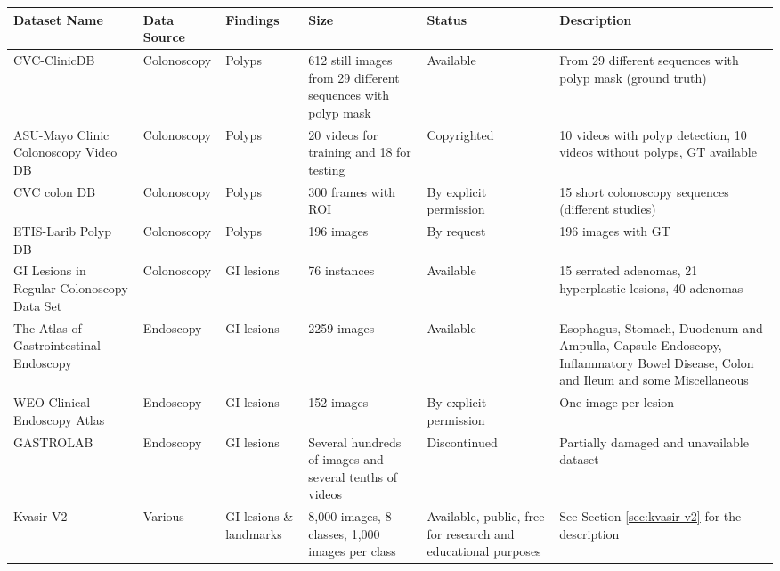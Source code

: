 \documentclass[thesis.tex]{subfiles}
\begin{document}
\begin{table}[h!] %
  \scriptsize
  \centering
  \begin{tabular}{|p{}|p{}|p{}|p{}|p{}|p{}|}
  	\hline
  	\textbf{Dataset Name}	&\textbf{Data Source}	&\textbf{Findings}	&\textbf{Size}	&\textbf{Status}		&\textbf{Description} \\
    \hline
    CVC-ClinicDB \cite{ExploringClinical16}	&Colonoscopy	&Polyps		&612 still images from 29 different sequences with polyp mask	&Available	&From 29 different sequences with
polyp mask (ground truth) \\ 
    \hline
    ASU-Mayo Clinic Colonoscopy Video DB \cite{AutomatedPolyp16}	&Colonoscopy	&Polyps	&20 videos for training and 18 for testing	&Copyrighted	&10 videos with polyp detection,
10 videos without polyps, GT available \\
	\hline
	CVC colon DB \cite{AutomaticPolyp12}	&Colonoscopy	&Polyps	&300 frames with ROI	&By explicit permission	&15 short colonoscopy sequences
(different studies) \\
	\hline
	ETIS-Larib Polyp DB \cite{EmbeddedDetection14}	&Colonoscopy	&Polyps	&196 images	&By request	&196 images with GT \\
	\hline
	GI Lesions in Regular Colonoscopy Data Set \cite{ComputerAidedClassification16}	&Colonoscopy	&GI lesions	&76 instances	&Available	&15 serrated adenomas, 21 hyperplastic lesions, 40 adenomas \\
	\hline
	The Atlas of Gastrointestinal Endoscopy\footnotemark	&Endoscopy	&GI lesions	&2259 images	&Available	&Esophagus, Stomach, Duodenum and Ampulla, Capsule Endoscopy, Inflammatory Bowel Disease, Colon and Ileum and some Miscellaneous \\
	\hline
	WEO Clinical Endoscopy Atlas\footnotemark	&Endoscopy	&GI lesions	&152 images	&By explicit permission	&One image per lesion \\
	\hline
	GASTROLAB\footnotemark	&Endoscopy	&GI lesions	&Several hundreds of images and several tenths of videos	&Discontinued	&Partially damaged and unavailable dataset \\
	\hline
	Kvasir-V2 \cite{KVASIRMultiClass17}	&Various	&GI lesions \& landmarks	&8,000 images, 8 classes, 1,000 images per class	&Available, public, free for research and educational purposes	&See Section \ref{sec:kvasir-v2} for the description \\
	\hline

\end{tabular}
\end{table}
\end{document}
